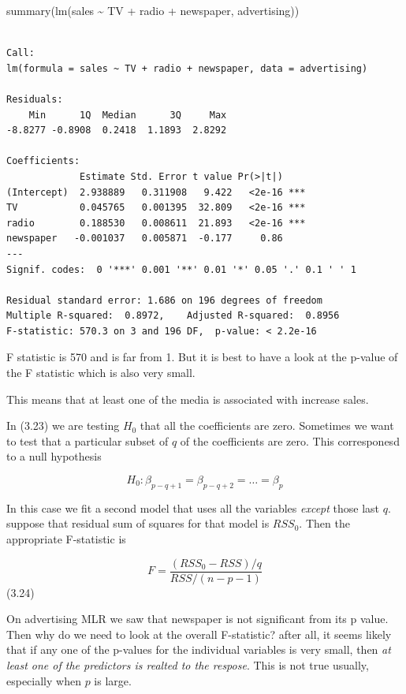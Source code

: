 \documentclass[
  letterpaper,
  DIV=11,
  numbers=noendperiod]{scrreprt}
\newenvironment{Shaded}{\begin{snugshade}}{\end{snugshade}}
\newcommand{\FunctionTok}[1]{\textcolor[rgb]{0.28,0.35,0.67}{#1}}
\newcommand{\NormalTok}[1]{\textcolor[rgb]{0.00,0.23,0.31}{#1}}
\newcommand{\SpecialCharTok}[1]{\textcolor[rgb]{0.37,0.37,0.37}{#1}}
\begin{document}
\begin{Shaded}
\begin{Highlighting}[]
\FunctionTok{summary}\NormalTok{(}\FunctionTok{lm}\NormalTok{(sales }\SpecialCharTok{\textasciitilde{}}\NormalTok{ TV }\SpecialCharTok{+}\NormalTok{ radio }\SpecialCharTok{+}\NormalTok{ newspaper, advertising))}
\end{Highlighting}
\end{Shaded}

\begin{verbatim}

Call:
lm(formula = sales ~ TV + radio + newspaper, data = advertising)

Residuals:
    Min      1Q  Median      3Q     Max 
-8.8277 -0.8908  0.2418  1.1893  2.8292 

Coefficients:
             Estimate Std. Error t value Pr(>|t|)    
(Intercept)  2.938889   0.311908   9.422   <2e-16 ***
TV           0.045765   0.001395  32.809   <2e-16 ***
radio        0.188530   0.008611  21.893   <2e-16 ***
newspaper   -0.001037   0.005871  -0.177     0.86    
---
Signif. codes:  0 '***' 0.001 '**' 0.01 '*' 0.05 '.' 0.1 ' ' 1

Residual standard error: 1.686 on 196 degrees of freedom
Multiple R-squared:  0.8972,    Adjusted R-squared:  0.8956 
F-statistic: 570.3 on 3 and 196 DF,  p-value: < 2.2e-16
\end{verbatim}

F statistic is 570 and is far from 1. But it is best to have a look at
the p-value of the F statistic which is also very small.

This means that at least one of the media is associated with increase
sales.

In (3.23) we are testing \(H_0\) that all the coefficients are zero.
Sometimes we want to test that a particular subset of \(q\) of the
coefficients are zero. This corresponesd to a null hypothesis

\[
  H_0 : \beta_{p-q+1} = \beta_{p-q+2} = \dots = \beta_p
  \]

In this case we fit a second model that uses all the variables
\emph{except} those last \(q\). suppose that residual sum of squares for
that model is \(RSS_0\). Then the appropriate F-statistic is

\[
  F = \frac{(RSS_0 - RSS)/q}{RSS/(n-p-1)}
  \] (3.24)

On advertising MLR we saw that newspaper is not significant from its p
value. Then why do we need to look at the overall F-statistic? after
all, it seems likely that if any one of the p-values for the individual
variables is very small, then \emph{at least one of the predictors is
realted to the respose}. This is not true usually, especially when \(p\)
is large.
\end{document}
